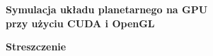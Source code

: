 


	\begin{center} \huge
	\textbf{Symulacja układu planetarnego na GPU\\ przy użyciu CUDA i OpenGL}
	\end{center}

	\begin{center} \Large\bf Streszczenie \end{center}
	


